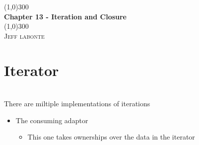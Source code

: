 \documentclass{article}
\begin{document}
  \begin{titlepage}
    \begin{center}
      \line(1,0){300} \\
      [0.25in]
      \huge{\bfseries Chapter 13 - Iteration and Closure}\\
      [2mm]
      \line(1,0){300}\\
      [1.5cm]
      \textsc{\LARGE Jeff labonte}\\
      [0.75cm]
    \end{center}
  \end{titlepage}
 \section{Iterator}
 \ \\[2mm]
 There are miltiple implementations of iterations \\
 \begin{itemize}
     \item The consuming adaptor
         \begin{itemize}
             \item This one takes ownerships over the data in the iterator 
         \end{itemize}
 \end{itemize}
\end{document}
